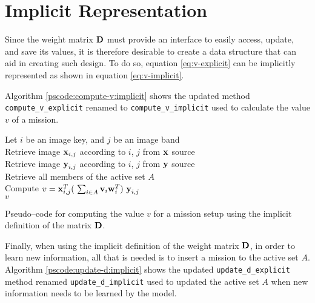 \section{Implicit Representation} \label{sect:meth:implicit}

Since the weight matrix $\boldsymbol{\mathbf{D}}$ must provide an interface to easily access, update, and save its values, it is therefore desirable to create a data structure that can aid in creating such design. To do so, equation \ref{eq:v-explicit} can be implicitly represented as shown in equation \ref{eq:v-implicit}. \newline

Algorithm \ref{pscode:compute-v:implicit} shows the updated method \texttt{compute\_v\_explicit} renamed to \texttt{compute\_v\_implicit} used to calculate the value $v$ of a mission.

\vspace{0.4cm}
\begin{algorithm}[H]
    \SetAlgoLined
         {
            Let $i$ be an image key, and $j$ be an image band \\
            Retrieve image $\boldsymbol{\mathbf{x}}_{i,j}$ according to $i$, $j$ from $\boldsymbol{\mathbf{x}}$ source \\
            Retrieve image $\boldsymbol{\mathbf{y}}_{i,j}$ according to $i$, $j$ from $\boldsymbol{\mathbf{y}}$ source \\
            Retrieve all members of the active set $A$ \\
            Compute $v = \boldsymbol{\mathbf{x}}_{i,j}^T (\ \sum_{i \in A} \boldsymbol{\mathbf{v}}_i \boldsymbol{\mathbf{w}}_i^T )\ \boldsymbol{\mathbf{y}}_{i,j}$ \\
            \Return $v$
        }
    \caption{Pseudo--code for computing the value $v$ for a mission setup using the implicit definition of the matrix $\boldsymbol{\mathbf{D}}$.}
    \label{pscode:compute-v:implicit}
\end{algorithm}
\vspace{0.4cm}

Finally, when using the implicit definition of the weight matrix $\boldsymbol{\mathbf{D}}$, in order to learn new information, all that is needed is to insert a mission to the active set $A$. Algorithm \ref{pscode:update-d:implicit} shows the updated \texttt{update\_d\_explicit} method renamed \texttt{update\_d\_implicit} used to updated the active set $A$ when new information needs to be learned by the model.

